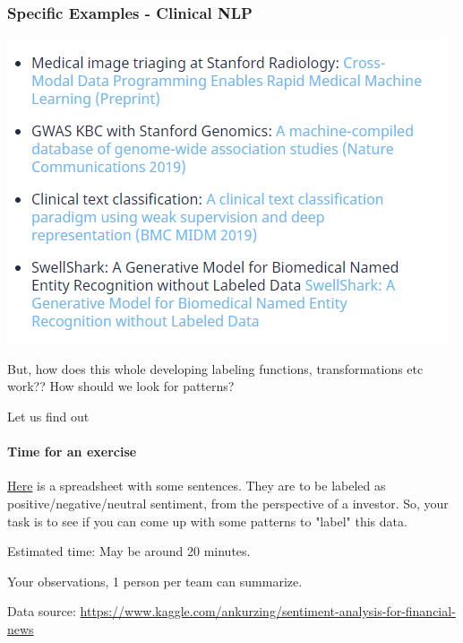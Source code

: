 \documentclass{beamer}
\begin{document}
\begin{frame}
\frametitle{Specific Examples - Clinical NLP}
    \includegraphics[width=\textwidth]{figures/snorkelclinicalnp.PNG}
\end{frame}

\begin{frame}{}
    But, how does this whole developing labeling functions, transformations etc work?? How should we look for patterns?
\end{frame}

\begin{frame}{Let us find out}
\framesubtitle{Time for an exercise}
    \href{https://docs.google.com/spreadsheets/d/1ESW1FQ36rSxFww3jo7IuAzw7HPq4_MATY9-hRhX6CnE/edit?usp=sharing}{Here} is a spreadsheet with some sentences. They are to be labeled as positive/negative/neutral sentiment, from the perspective of a investor. So, your task is to see if you can come up with some patterns to "label" this data.
    
    Estimated time: May be around 20 minutes. 
\end{frame}

\begin{frame}{}
    Your observations, 1 person per team can summarize.
    
    Data source: \url{https://www.kaggle.com/ankurzing/sentiment-analysis-for-financial-news}
\end{frame}
\end{document}
